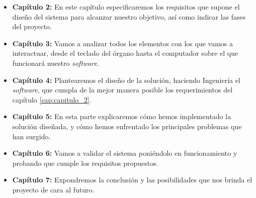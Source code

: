 \begin{itemize}

\item \textbf{Capítulo 2:} En este capítulo especificaremos los requisitos que supone el diseño del sistema para alcanzar nuestro objetivo, así como indicar las fases del proyecto.

\item \textbf{Capítulo 3:} Vamos a analizar todos los elementos con los que vamos a interactuar, desde el teclado del órgano hasta el computador sobre el que funcionará nuestro \textit{software}. 

\item \textbf{Capítulo 4:} Plantearemos el diseño de la solución, haciendo Ingeniería el \textit{software}, que cumpla de la mejor manera posible los requerimientos del capítulo \ref{cap:capitulo_2}.

\item \textbf{Capítulo 5:} En esta parte explicaremos cómo hemos implementado la solución diseñada, y cómo hemos enfrentado los principales problemas que han surgido.

\item \textbf{Capítulo 6:} Vamos a validar el sistema poniéndolo en funcionamiento y probando que cumple los requisitos propuestos.

\item \textbf{Capítulo 7:} Expondremos la conclusión y las posibilidades que nos brinda el proyecto de cara al futuro.
  
\end{itemize}

\newpage
\clearpage{\pagestyle{empty}\cleardoublepage}
